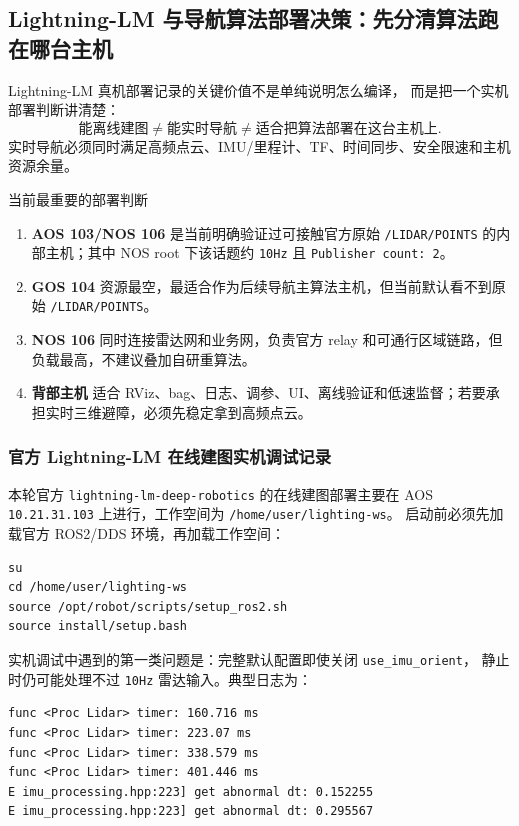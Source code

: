 \documentclass[UTF8,11pt,a4paper]{ctexart}
\begin{document}
\subsection{Lightning-LM 与导航算法部署决策：先分清算法跑在哪台主机}

Lightning-LM 真机部署记录的关键价值不是单纯说明怎么编译，
而是把一个实机部署判断讲清楚：
\[
\text{能离线建图}
\neq
\text{能实时导航}
\neq
\text{适合把算法部署在这台主机上}.
\]
实时导航必须同时满足高频点云、IMU/里程计、TF、时间同步、安全限速和主机资源余量。

\begin{greenbox}{当前最重要的部署判断}
\begin{enumerate}
  \item \textbf{AOS 103/NOS 106} 是当前明确验证过可接触官方原始 \texttt{/LIDAR/POINTS} 的内部主机；其中 NOS root 下该话题约 \texttt{10Hz} 且 \texttt{Publisher count: 2}。
  \item \textbf{GOS 104} 资源最空，最适合作为后续导航主算法主机，但当前默认看不到原始 \texttt{/LIDAR/POINTS}。
  \item \textbf{NOS 106} 同时连接雷达网和业务网，负责官方 relay 和可通行区域链路，但负载最高，不建议叠加自研重算法。
  \item \textbf{背部主机} 适合 RViz、bag、日志、调参、UI、离线验证和低速监督；若要承担实时三维避障，必须先稳定拿到高频点云。
\end{enumerate}
\end{greenbox}

\subsubsection{官方 Lightning-LM 在线建图实机调试记录}

本轮官方 \texttt{lightning-lm-deep-robotics} 的在线建图部署主要在 AOS
\texttt{10.21.31.103} 上进行，工作空间为 \texttt{/home/user/lighting-ws}。
启动前必须先加载官方 ROS2/DDS 环境，再加载工作空间：

\begin{verbatim}
su
cd /home/user/lighting-ws
source /opt/robot/scripts/setup_ros2.sh
source install/setup.bash
\end{verbatim}

实机调试中遇到的第一类问题是：完整默认配置即使关闭 \texttt{use\_imu\_orient}，
静止时仍可能处理不过 \texttt{10Hz} 雷达输入。典型日志为：

\begin{verbatim}
func <Proc Lidar> timer: 160.716 ms
func <Proc Lidar> timer: 223.07 ms
func <Proc Lidar> timer: 338.579 ms
func <Proc Lidar> timer: 401.446 ms
E imu_processing.hpp:223] get abnormal dt: 0.152255
E imu_processing.hpp:223] get abnormal dt: 0.295567
\end{verbatim}
\end{document}
